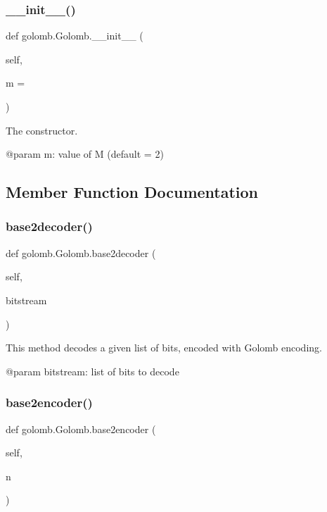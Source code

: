 \subsubsection{\texorpdfstring{\+\_\+\+\_\+init\+\_\+\+\_\+()}{\_\_init\_\_()}}
{\footnotesize\ttfamily def golomb.\+Golomb.\+\_\+\+\_\+init\+\_\+\+\_\+ (\begin{DoxyParamCaption}\item[{}]{self,  }\item[{}]{m = {} }\end{DoxyParamCaption})}

\begin{DoxyVerb}The constructor.

@param m: value of M (default = 2)
\end{DoxyVerb}
 

\subsection{Member Function Documentation}
\mbox{\label{classgolomb_1_1Golomb_a50988a7193b544bc61ac9ebfb96d81e1}} 
\subsubsection{\texorpdfstring{base2decoder()}{base2decoder()}}
{\footnotesize\ttfamily def golomb.\+Golomb.\+base2decoder (\begin{DoxyParamCaption}\item[{}]{self,  }\item[{}]{bitstream }\end{DoxyParamCaption})}

\begin{DoxyVerb}This method decodes a given list of bits, encoded with Golomb encoding.

@param bitstream: list of bits to decode
\end{DoxyVerb}
 \mbox{\label{classgolomb_1_1Golomb_a1f91bc279c5b37d998de933389ad9739}} 
\subsubsection{\texorpdfstring{base2encoder()}{base2encoder()}}
{\footnotesize\ttfamily def golomb.\+Golomb.\+base2encoder (\begin{DoxyParamCaption}\item[{}]{self,  }\item[{}]{n }\end{DoxyParamCaption})}

